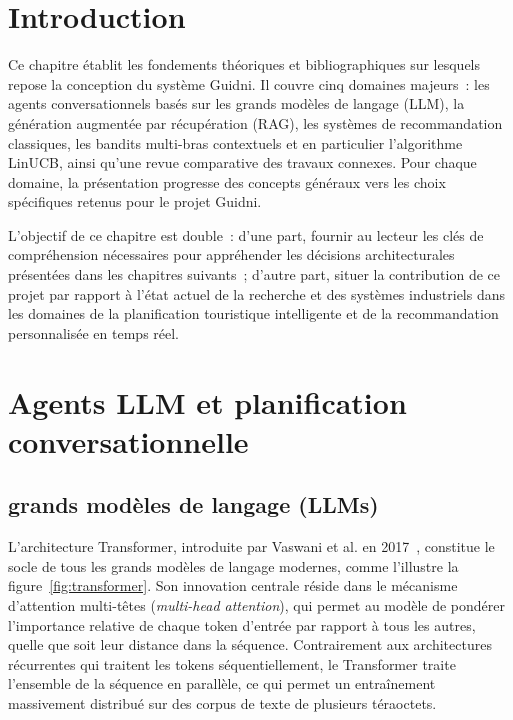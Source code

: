 
\section{Introduction}

Ce chapitre établit les fondements théoriques et bibliographiques sur lesquels repose la
conception du système Guidni. Il couvre cinq domaines majeurs~: les agents conversationnels
basés sur les grands modèles de langage (LLM), la génération augmentée par récupération (RAG),
les systèmes de recommandation classiques, les bandits multi-bras contextuels et en particulier
l'algorithme LinUCB, ainsi qu'une revue comparative des travaux connexes. Pour chaque domaine,
la présentation progresse des concepts généraux vers les choix spécifiques retenus pour le
projet Guidni.

L'objectif de ce chapitre est double~: d'une part, fournir au lecteur les clés de compréhension
nécessaires pour appréhender les décisions architecturales présentées dans les chapitres suivants~;
d'autre part, situer la contribution de ce projet par rapport à l'état actuel de la recherche et
des systèmes industriels dans les domaines de la planification touristique intelligente et de la
recommandation personnalisée en temps réel.


\section{Agents LLM et planification conversationnelle}

\subsection{grands modèles de langage (LLMs)}

L'architecture Transformer, introduite par Vaswani et al. en 2017~\cite{vaswani2017attention},
constitue le socle de tous les grands modèles de langage modernes, comme l'illustre la figure~\ref{fig:transformer}. Son innovation centrale réside
dans le mécanisme d'attention multi-têtes (\textit{multi-head attention}), qui permet au modèle
de pondérer l'importance relative de chaque token d'entrée par rapport à tous les autres, quelle
que soit leur distance dans la séquence. Contrairement aux architectures récurrentes qui traitent
les tokens séquentiellement, le Transformer traite l'ensemble de la séquence en parallèle, ce qui
permet un entraînement massivement distribué sur des corpus de texte de plusieurs téraoctets.

